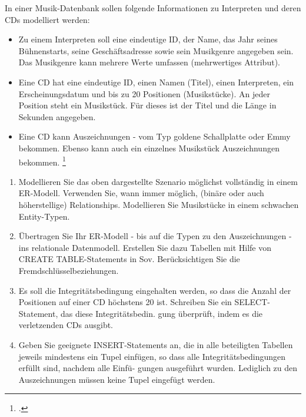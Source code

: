 \documentclass{bschlangaul-aufgabe}
\begin{document}

In einer Musik-Datenbank sollen folgende Informationen zu Interpreten und deren CDs modelliert
werden:

\begin{itemize}
\item Zu einem Interpreten soll eine eindeutige ID, der Name, das Jahr
seines Bühnenstarts, seine Geschäftsadresse sowie sein Musikgenre
angegeben sein. Das Musikgenre kann mehrere Werte umfassen (mehrwertiges
Attribut).

\item Eine CD hat eine eindeutige ID, einen Namen (Titel), einen
Interpreten, ein Erscheinungsdatum und bis zu 20 Positionen
(Musikstücke). An jeder Position steht ein Musikstück. Für dieses ist
der Titel und die Länge in Sekunden angegeben.

\item Eine CD kann Auszeichnungen - \zB vom Typ goldene Schallplatte
oder Emmy bekommen. Ebenso kann auch ein einzelnes Musikstück
Auszeichnungen bekommen.
\footcite{examen:66116:2015:03}
\end{itemize}
\begin{enumerate}


\item  Modellieren Sie das oben dargestellte Szenario möglichst
vollständig in einem ER-Modell. Verwenden Sie, wann immer möglich,
(binäre oder auch höherstellige) Relationships. Modellieren Sie
Musikstücke in einem schwachen Entity-Typen.


\item Übertragen Sie Ihr ER-Modell - bis auf die Typen zu den
Auszeichnungen - ins relationale Datenmodell. Erstellen Sie dazu
Tabellen mit Hilfe von CREATE TABLE-Statements in Sov. Berücksichtigen
Sie die Fremdschlüsselbeziehungen.


\item Es soll die Integritätsbedingung eingehalten werden, so dass die
Anzahl der Positionen auf einer CD höchstens 20 ist. Schreiben Sie ein
SELECT-Statement, das diese Integritätsbedin. gung überprüft, indem es
die verletzenden CDs ausgibt.


\item Geben Sie geeignete INSERT-Statements an, die in alle beteiligten
Tabellen jeweils mindestens ein Tupel einfügen, so dass alle
Integritätsbedingungen erfüllt sind, nachdem alle Einfü- gungen
ausgeführt wurden. Lediglich zu den Auszeichnungen müssen keine Tupel
eingefügt werden.
\end{enumerate}
\end{document}
